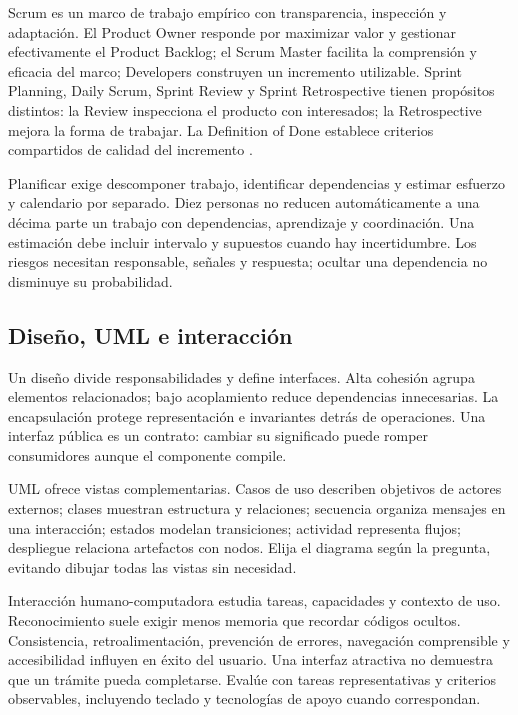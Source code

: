 Scrum es un marco de trabajo empírico con transparencia, inspección y adaptación. El Product Owner responde por maximizar valor y gestionar efectivamente el Product Backlog; el Scrum Master facilita la comprensión y eficacia del marco; Developers construyen un incremento utilizable. Sprint Planning, Daily Scrum, Sprint Review y Sprint Retrospective tienen propósitos distintos: la Review inspecciona el producto con interesados; la Retrospective mejora la forma de trabajar. La Definition of Done establece criterios compartidos de calidad del incremento \cite[secciones Scrum Team, Events y Artifacts]{scrum}.

Planificar exige descomponer trabajo, identificar dependencias y estimar esfuerzo y calendario por separado. Diez personas no reducen automáticamente a una décima parte un trabajo con dependencias, aprendizaje y coordinación. Una estimación debe incluir intervalo y supuestos cuando hay incertidumbre. Los riesgos necesitan responsable, señales y respuesta; ocultar una dependencia no disminuye su probabilidad.

\subsection{Diseño, UML e interacción}
Un diseño divide responsabilidades y define interfaces. Alta cohesión agrupa elementos relacionados; bajo acoplamiento reduce dependencias innecesarias. La encapsulación protege representación e invariantes detrás de operaciones. Una interfaz pública es un contrato: cambiar su significado puede romper consumidores aunque el componente compile.

UML ofrece vistas complementarias. Casos de uso describen objetivos de actores externos; clases muestran estructura y relaciones; secuencia organiza mensajes en una interacción; estados modelan transiciones; actividad representa flujos; despliegue relaciona artefactos con nodos. Elija el diagrama según la pregunta, evitando dibujar todas las vistas sin necesidad.

Interacción humano-computadora estudia tareas, capacidades y contexto de uso. Reconocimiento suele exigir menos memoria que recordar códigos ocultos. Consistencia, retroalimentación, prevención de errores, navegación comprensible y accesibilidad influyen en éxito del usuario. Una interfaz atractiva no demuestra que un trámite pueda completarse. Evalúe con tareas representativas y criterios observables, incluyendo teclado y tecnologías de apoyo cuando correspondan.

